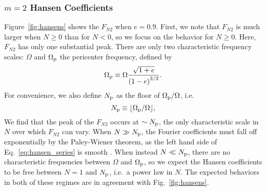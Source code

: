 \documentclass[
        fleqn,
        usenatbib,
    ]{mnras}
\newcommand*{\p}[1]{\left(#1\right)}
\begin{document}
\subsubsection{$m=2$ Hansen Coefficients}

Figure~\ref{fig:hansens} shows the $F_{N2}$ when $e = 0.9$. First, we note that
$F_{N2}$ is much larger when $N \geq 0$ than for $N < 0$, so we focus on the
behavior for $N \geq 0$. Here, $F_{N2}$ has only one substantial peak. There are
only two characteristic frequency scales: $\Omega$ and $\Omega_{\rm p}$ the
pericenter frequency, defined by
\begin{equation}
    \Omega_{\rm p} \equiv \Omega \frac{\sqrt{1 + e}}{\p{1 - e}^{3/2}}.
        \label{eq:Wperi}
\end{equation}
For convenience, we also define $N_{\rm p}$ as the floor of $\Omega_{\rm p} /
\Omega$, i.e.
\begin{equation}
    N_{\rm p} \equiv \lfloor \Omega_{\rm p} / \Omega\rfloor,
\end{equation}
We find that the peak of the $F_{N2}$ occurs at $\sim N_{\rm p}$, the only
characteristic scale in $N$ over which $F_{N2}$ can vary. When $N \gg N_{\rm
p}$, the Fourier coefficients must fall off exponentially by the Paley-Wiener
theorem, as the left hand side of Eq.~\eqref{eq:hansen_series} is smooth
\citep[e.g.][]{stein2009real}. When instead $N \ll N_{\rm p}$, there are no
characteristic frequencies between $\Omega$ and $\Omega_{\rm p}$, so we expect
the Hansen coefficients to be free between $N = 1$ and $N_{\rm p}$, i.e.\ a
power law in $N$. The expected behaviors in both of these regimes are in
agreement with Fig.~\ref{fig:hansens}.
\end{document}
